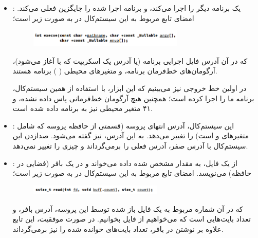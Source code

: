 \documentclass{article}
\begin{document}
	\begin{itemize}
		\item{
			:
		}
		یک برنامه دیگر را اجرا می‌کند، و برنامه اجرا شده را جایگزین
		فعلی می‌کند. امضای تابع مربوط به این سیستم‌کال در
		به صورت زیر است؛

		\begin{figure}[H]
			\centering
			\includegraphics[width=0.7\textwidth]{execve_sig}
		\end{figure}

		که در آن
		آدرس فایل اجرایی برنامه (یا آدرس یک اسکریپت که با  آغاز می‌شود)،
		آرگومان‌های خط‌فرمان برنامه، و
		متغیرهای محیطی (
		)
		برنامه هستند.

		در اولین خط خروجی
		نیز می‌بینیم که این ابزار، با استفاده از همین سیستم‌کال، برنامه ما را اجرا کرده است؛ همچنین هیچ آرگومان خط‌فرمانی پاس داده نشده، و ۴۱ متغیر محیطی نیز به برنامه داده شده است.


		\item{
			:
		}
		این سیستم‌کال، آدرس انتهای
		پروسه (قسمتی از حافظه پروسه که شامل متغیر‌های
		و
		است) را تغییر می‌دهد. به این آدرس،
		نیز گفته می‌شود. صدا‌زدن این سیستم‌کال با آدرس صفر، آدرس فعلی
		را برمی‌گرداند و چیزی را تغییر نمی‌دهد.

		\item{
			:
		}
		از یک فایل، به مقدار مشخص شده داده می‌خواند و در یک بافر (فضایی در حافظه) می‌نویسد. امضای تابع مربوط به این سیستم‌کال در
		به صورت زیر است؛

		\begin{figure}[H]
			\centering
			\includegraphics[width=0.6\textwidth]{read_sig}
		\end{figure}

		که در آن
		شماره
		مربوط به یک فایل باز شده توسط این پروسه،
		آدرس بافر، و
		تعداد بایت‌هایی است که می‌خواهیم از فایل بخوانیم. در صورت موفقیت، این تابع علاوه بر نوشتن در بافر، تعداد بایت‌های خوانده شده را نیز برمی‌گرداند.


\end{itemize}
\end{document}
